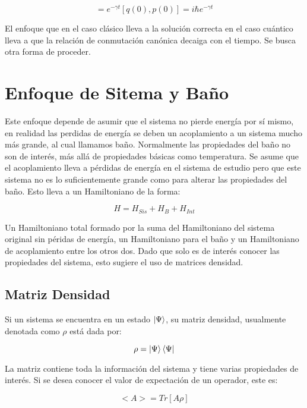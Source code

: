 \documentclass[a4paper,10pt]{report}
\begin{document}
\begin{equation}
[q(t),p(t)] = e^{-\gamma t}[q(0),p(0)] = i\hbar e^{-\gamma t}
\end{equation}

El enfoque que en el caso clásico lleva a la solución correcta en el caso cuántico lleva a que la relación de conmutación canónica decaiga con el tiempo. Se busca otra forma de proceder.

\section{Enfoque de Sitema y Baño}

Este enfoque depende de asumir que el sistema no pierde energía por sí mismo, en realidad las perdidas de energía se deben un acoplamiento a un sistema mucho más grande, al cual llamamos baño. Normalmente las propiedades del baño no son de interés, más allá de propiedades básicas como temperatura. Se asume que el acoplamiento lleva a pérdidas de energía en el sistema de estudio pero que este sistema no es lo suficientemente grande como para alterar las propiedades del baño. Esto lleva a un Hamiltoniano de la forma:

\begin{equation} \label{BathSysH}
H = H_{Sis} + H_{B} + H_{Int}
\end{equation}

Un Hamiltoniano total formado por la suma del Hamiltoniano del sistema original sin péridas de energía, un Hamiltoniano para el baño y un Hamiltoniano de acoplamiento entre los otros dos.  Dado que solo es de interés conocer las propiedades del sistema, esto sugiere el uso de matrices densidad.

\subsection{Matriz Densidad}

Si un sistema se encuentra en un estado $\Ket{\Psi}$, su matriz densidad\cite{BlumDM}, usualmente denotada como $\rho$ está dada por:

\begin{equation}
\rho = \Ket{\Psi}\Bra{\Psi}
\end{equation}

La matriz contiene toda la información del sistema y tiene varias propiedades de interés. Si se desea conocer el valor de expectación de un operador, este es:

\begin{equation}
<A> = Tr[A\rho]
\end{equation}
\end{document}
